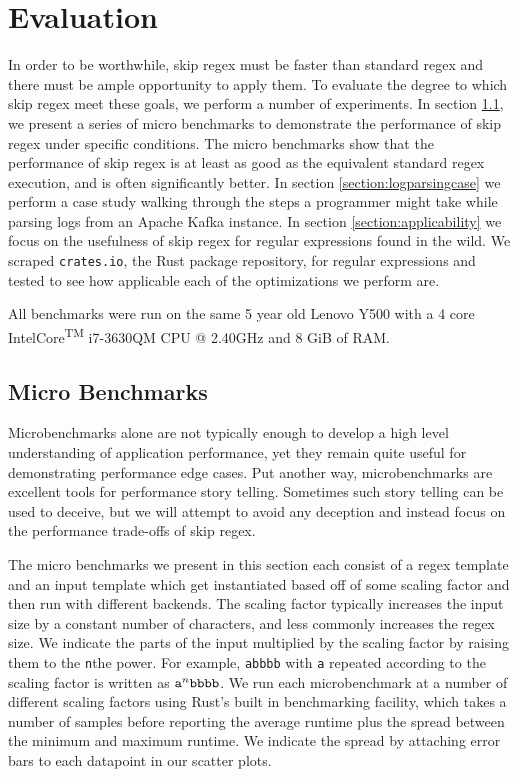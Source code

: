 \chapter{Evaluation}
\label{chapter:evaluation}

In order to be worthwhile, skip regex must be faster than standard
regex and there must be ample opportunity to apply them. To evaluate
the degree to which skip regex meet these goals, we perform a number
of experiments. In section \ref{section:microbenchmarks}, we present a
series of micro benchmarks to demonstrate
the performance of skip regex under specific conditions. The micro
benchmarks show that the performance of skip regex is
at least as good as the equivalent standard regex execution, and 
is often significantly better.
In section \ref{section:logparsingcase} we perform a case study walking
through the steps a programmer might take while parsing logs from
an Apache Kafka instance.
In section \ref{section:applicability} we focus on the usefulness of
skip regex for regular expressions found in the wild. We scraped
\verb'crates.io', the Rust package repository,
for regular expressions and tested to see how applicable each of the 
optimizations we perform are. 

All benchmarks were run on the same 5 year old Lenovo Y500 with a 4 core
Intel\textregistered Core\textsuperscript{TM} i7-3630QM CPU @
2.40GHz and 8 GiB of RAM.

\section{Micro Benchmarks}
\label{section:microbenchmarks}

Microbenchmarks alone are not typically enough to develop a high
level understanding of application performance, yet they remain
quite useful for demonstrating performance edge cases. Put another
way, microbenchmarks are excellent tools for performance story
telling. Sometimes such story telling can be used to deceive,
but we will attempt to avoid any deception and instead focus
on the performance trade-offs of skip regex.

The micro benchmarks we present in this section each consist of
a regex template and an input template which get instantiated
based off of some scaling factor and then run with different
backends. The scaling factor typically increases the input
size by a constant number of characters, and less commonly
increases the regex size. We indicate the parts of the
input multiplied by the scaling factor by raising them
to the \verb'n'the power. For example, \verb'abbbb' with \verb'a'
repeated according to the scaling factor is written as
${\tt a}^n{\tt bbbb}$. We run each microbenchmark at a
number of different scaling factors using Rust's built in
benchmarking facility, which takes a number of samples before
reporting the average runtime plus the spread between the minimum
and maximum runtime. We indicate the spread by attaching error bars to
each datapoint in our scatter plots.

